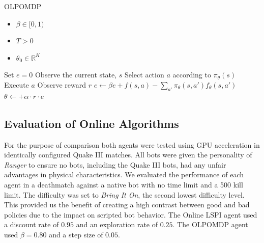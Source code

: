 \begin{algorithm}
\caption{OLPOMDP}
\label{olpomdp}
    {\fontsize{12}{10}\selectfont
    \begin{algorithmic}[1]
        \REQUIRE
            \begin{itemize} 
                \item $\beta \in [0,1)$ 
                \item $T > 0$ 
                \item $\theta_0 \in \mathbb{R}^K$ 
            \end{itemize}
    \STATE Set $e = 0$
        \STATE Observe the current state, $s$
        \STATE Select action $a$ according to $\pi_\theta(s)$
        \STATE Execute $a$
        \STATE Observe reward $r$
        \STATE $e \leftarrow \beta e + f(s,a) - \sum\limits_{a'}\pi_\theta(s,a')f_\theta(s,a')$
        \STATE $\theta \leftarrow + \alpha \cdot r \cdot e$
    \ENDFOR
    \end{algorithmic}
    }
\end{algorithm}

\subsection{Evaluation of Online Algorithms}

For the purpose of comparison both agents were tested using GPU acceleration in identically configured Quake III matches. All bots were given the personality of \emph{Ranger} to ensure no bots, including the Quake III bots, had any unfair advantages in physical characteristics. We evaluated the performance of each agent in a deathmatch against a native bot with no time limit and a 500 kill limit. The difficulty was set to \emph{Bring It On}, the second lowest difficulty level. This provided us the benefit of creating a high contrast between good and bad policies due to the impact on scripted bot behavior. The Online LSPI agent used a discount rate of $0.95$ and an exploration rate of $0.25$. The OLPOMDP agent used $\beta = 0.80$ and a step size of $0.05$.

